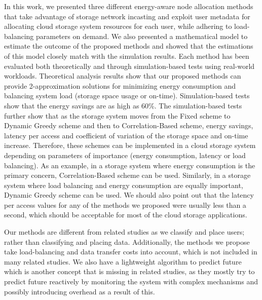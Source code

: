 In this work, we presented three different energy-aware node allocation
methods that take advantage of storage network incasting and exploit user
metadata for allocating cloud storage system resources for each user, while
adhering to load-balancing parameters on demand. We also presented a mathematical
model to estimate the outcome of the proposed methods and showed that the estimations
of this model closely match with the simulation results. Each method has been
evaluated both theoretically and through simulation-based tests using real-world
workloads. Theoretical analysis results show that our proposed methods
can provide 2-approximation solutions for minimizing energy consumption
and balancing system load (storage space usage or on-time). Simulation-based
tests show that the energy savings are as high as 60\%. The simulation-based 
tests further show that as the storage system moves from the Fixed scheme to
Dynamic Greedy scheme and then to Correlation-Based scheme, energy savings, latency
per access and coefficient of variation of the storage space and on-time increase. Therefore,
these schemes can be implemented in a cloud storage system depending on parameters
of importance (energy consumption, latency or load balancing). As an example, in
a storage system where energy consumption is the primary concern, Correlation-Based
scheme can be used. Similarly, in a storage system where load balancing and energy consumption
are equally important, Dynamic Greedy scheme can be used. We should also point
out that the latency per access values for any of the methods we proposed were
usually less than a second, which should be acceptable for most of the cloud
storage applications.

Our methods are different from related studies as we classify and place users; rather
than classifying and placing data. Additionally,
the methods we propose take load-balancing and data transfer costs into account,
which is not included in many related studies. We also have a lightweight algorithm
to predict future which is another concept that is missing in related studies, as
they mostly try to predict future reactively by monitoring the system with complex
mechanisms and possibly introducing overhead as a result of this.

